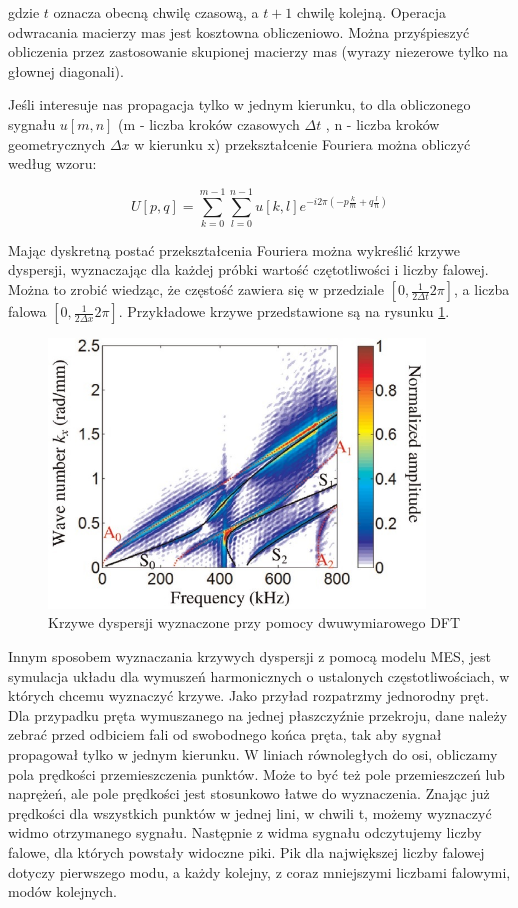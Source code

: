 gdzie \( t \) oznacza obecną chwilę czasową, a \( t+1 \) chwilę kolejną.
Operacja odwracania macierzy mas jest kosztowna obliczeniowo. Można przyśpieszyć obliczenia przez zastosowanie skupionej macierzy mas (wyrazy niezerowe tylko na głownej diagonali).

Jeśli interesuje nas propagacja tylko w jednym kierunku, to dla obliczonego sygnału \( u[m, n] \) (m - liczba kroków czasowych \(\Delta t \) , n - liczba kroków geometrycznych \(\Delta x\) w kierunku x) przekształcenie Fouriera można obliczyć według wzoru:

\begin{equation} \label{eq:fourier_2d}
U[p, q] = \sum_{k=0}^{m-1} \sum_{l=0}^{n-1} u[k, l]e^{-i2\pi (-p \frac{k}{m} + q\frac{l}{n})}
\end{equation}

Mając dyskretną postać przekształcenia Fouriera można wykreślić krzywe dyspersji, wyznaczając dla każdej próbki wartość czętotliwości i liczby falowej. Można to zrobić wiedząc, że częstość zawiera się w przedziale \([0, \frac{1}{2\Delta t}2\pi]\), a liczba falowa \([0, \frac{1}{2\Delta x}2\pi]\). Przykładowe krzywe przedstawione są na rysunku \ref{fig:krzywe_dyspersji_tian1}.

\vspace{5mm}

\begin{figure}[h]
\centering
\includegraphics[width=10cm]{Zdjecia/2/dyspersja_tian1}
\caption{Krzywe dyspersji wyznaczone przy pomocy dwuwymiarowego DFT \cite{bartek_tian}}
\label{fig:krzywe_dyspersji_tian1}
\end{figure}

Innym sposobem wyznaczania krzywych dyspersji z pomocą modelu MES, jest symulacja układu dla wymuszeń harmonicznych o ustalonych częstotliwościach, w których chcemu wyznaczyć krzywe. Jako przyład rozpatrzmy jednorodny pręt. Dla przypadku pręta wymuszanego na jednej płaszczyźnie przekroju, dane należy zebrać przed odbiciem fali od swobodnego końca pręta, tak aby sygnał propagował tylko w jednym kierunku. W liniach równoległych do osi, obliczamy pola prędkości przemieszczenia punktów. Może to być też pole przemieszczeń lub naprężeń, ale pole prędkości jest stosunkowo łatwe do wyznaczenia.
Znając już prędkości dla wszystkich punktów w jednej lini, w chwili t, możemy wyznaczyć widmo otrzymanego sygnału. Następnie z widma sygnału odczytujemy liczby falowe, dla których powstały widoczne piki. Pik dla największej liczby falowej dotyczy pierwszego modu, a każdy kolejny, z coraz mniejszymi liczbami falowymi, modów kolejnych.


